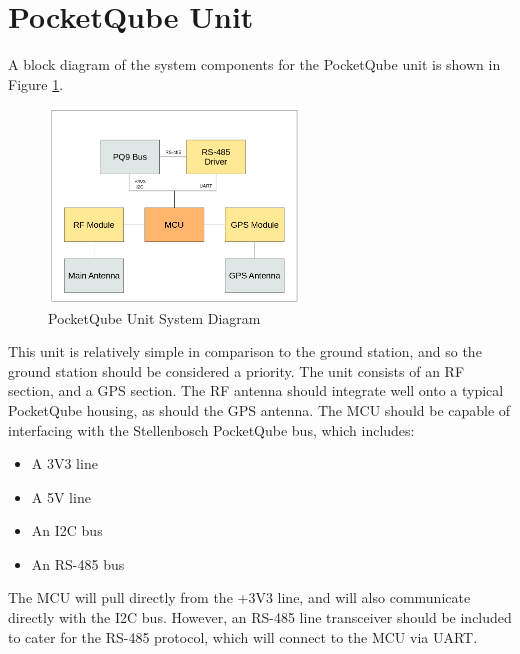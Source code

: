 \graphicspath{{./figures}}

\section{PocketQube Unit}
A block diagram of the system components for the PocketQube unit is shown in Figure \ref{fig:pqunit_system}.

\begin{figure}[!htb]
  \centering
  \includegraphics[width=0.6\textwidth]{pqunit_system}
  \caption{PocketQube Unit System Diagram}
  \label{fig:pqunit_system}
\end{figure}

This unit is relatively simple in comparison to the ground station, and so the ground station should be considered a priority. The unit consists of an RF section, and a GPS section. The RF antenna should integrate well onto a typical PocketQube housing, as should the GPS antenna. The MCU should be capable of interfacing with the Stellenbosch PocketQube bus, which includes:
\begin{itemize}
    \item A 3V3 line
    \item A 5V line
    \item An I2C bus
    \item An RS-485 bus
\end{itemize}
\noindent The MCU will pull directly from the +3V3 line, and will also communicate directly with the I2C bus. However, an RS-485 line transceiver should be included to cater for the RS-485 protocol, which will connect to the MCU via UART.